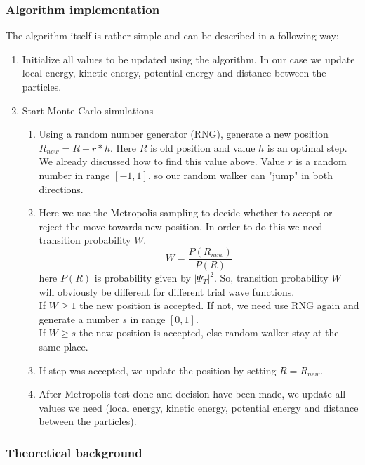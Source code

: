 \documentclass[10pt]{article}
\begin{document}
\subsubsection{Algorithm implementation}
The algorithm itself is rather simple and can be described in a following way:
 \begin{enumerate}
\item Initialize all values to be updated using the algorithm. In our case we update local energy, kinetic energy, potential energy and distance between the particles.
\item Start Monte Carlo simulations
  \begin{enumerate}
  \item Using a random number generator (RNG), generate a new position $R_{new} = R + r*h$. Here $R$ is old position and value $h$ is an optimal step. We already discussed how to find this value above. Value $r$ is a random number in range $[-1,1]$, so our random walker can "jump" in both directions. 
  \item Here we use the Metropolis sampling to decide whether to accept or reject the move towards new position. In order to do this we need transition probability $W$. 
  \begin{equation}
  W=\frac{P(R_{new})}{P(R)}
  \end{equation}
  here $P(R)$ is probability given by $|\Psi_T|^2$. So, transition probability $W$ will obviously be different for different trial wave functions.\\
  If $W \geq 1$ the new position is accepted. If not, we need use RNG again and generate a number $s$ in range $[0,1]$. \\
  If $W \geq s$ the new position is accepted, else random walker stay at the same place.
    \item If step was accepted, we update the position by setting $R=R_{new}$.
    \item After Metropolis test done and decision have been made, we update all values we need (local energy, kinetic energy, potential energy and distance between the particles).
\end{enumerate}
\end{enumerate}

\subsubsection{Theoretical background}
\end{document}
